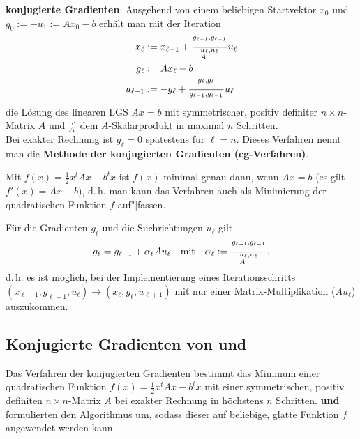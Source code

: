 \linie

\textbf{konjugierte Gradienten}:
Ausgehend von einem beliebigen Startvektor $x_0$ und \\
$g_0 := -u_1 := Ax_0 - b$ erhält man mit der Iteration
\begin{align*}
    x_\ell & := x_{\ell-1} +
    \frac{\sp{g_{\ell-1}, g_{\ell-1}}}{\sp{u_\ell, u_\ell}_A} u_\ell \\
    g_\ell & := Ax_\ell - b \\
    u_{\ell+1} & := -g_\ell +
    \frac{\sp{g_\ell, g_\ell}}{\sp{g_{\ell-1}, g_{\ell-1}}} u_\ell
\end{align*}
die Lösung des linearen LGS $Ax = b$ mit symmetrischer, positiv definiter
$n \times n$-Matrix $A$ und $\sp{\cdot, \cdot}_A$ dem $A$-Skalarprodukt
in maximal $n$ Schritten. \\
Bei exakter Rechnung ist $g_\ell = 0$ spätestens für $\ell = n$.
Dieses Verfahren nennt man die
\textbf{Methode der konjugierten Gradienten (cg-Verfahren)}.

Mit $f(x) = \frac{1}{2} x^t A x - b^t x$ ist $f(x)$ minimal genau dann, wenn
$Ax = b$ (es gilt $f'(x) = Ax - b$), d.\,h. man kann das Verfahren auch
als Minimierung der quadratischen Funktion $f$ auf"|fassen.

Für die Gradienten $g_\ell$ und die Suchrichtungen $u_\ell$ gilt
\begin{align*}
    g_\ell = g_{\ell-1} + \alpha_\ell A u_\ell \quad\text{mit}\quad
    \alpha_\ell := \frac{\sp{g_{\ell-1}, g_{\ell-1}}}{\sp{u_\ell, u_\ell}_A},
\end{align*}
d.\,h. es ist möglich, bei der Implementierung eines Iterationsschritts \\
$(x_{\ell-1}, g_{\ell-1}, u_\ell) \rightarrow (x_\ell, g_\ell, u_{\ell+1})$
mit nur einer Matrix-Multiplikation ($Au_\ell$) auszukommen.

\pagebreak

\subsection{%
    Konjugierte Gradienten von  und %
}

Das Verfahren der konjugierten Gradienten bestimmt das Minimum einer
quadratischen Funktion $f(x) = \frac{1}{2} x^t A x - b^t x$ mit einer
symmetrischen, positiv definiten $n \times n$-Matrix $A$ bei exakter Rechnung
in höchstens $n$ Schritten.
\textbf{ und } formulierten den Algorithmus um,
sodass dieser auf beliebige, glatte Funktion $f$ angewendet werden kann.

